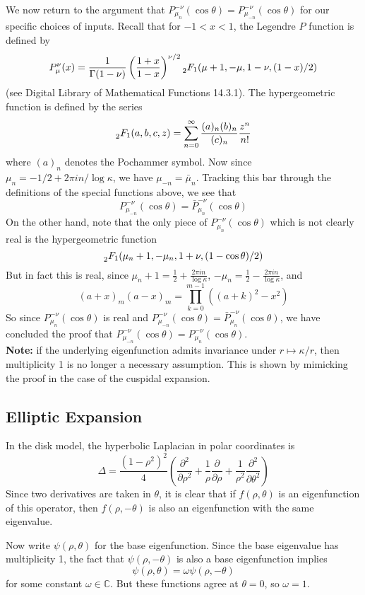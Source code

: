 \documentclass[]{article}
\begin{document}
We now return to the argument that $P_{\mu_{n}}^{-\nu}(\cos\theta) = P_{\mu_{-n}}^{-\nu}(\cos\theta)$ for our specific choices of inputs.
Recall that for $-1 < x < 1$, the Legendre $P$ function is defined by
$$
P_\mu^\nu(x) = 
\frac{1}{\Gamma(1 - \nu)}\left( \frac{1 + x}{1 - x} \right)^{\nu/2}\prescript{}{2}{F_1}(\mu + 1, -\mu, 1 - \nu, (1 - x)/2)
$$
(see Digital Library of Mathematical Functions 14.3.1).
The hypergeometric function is defined by the series
$$
\prescript{}{2}{F_1}(a, b, c, z) = \sum_{n=0}^{\infty}\frac{(a)_n(b)_n}{(c)_n}\frac{z^n}{n!}
$$
where $(a)_n$ denotes the Pochammer symbol.
Now since $\mu_n = -1/2 + 2\pi in/\log\kappa$, we have $\mu_{-n} = \bar{\mu}_n$.
Tracking this bar through the definitions of the special functions above, we see that
$$
P_{\mu_{-n}}^{-\nu}(\cos\theta) = \bar{P}_{\mu_{n}}^{-\nu}(\cos\theta)
$$
On the other hand, note that the only piece of $P_{\mu_{n}}^{-\nu}(\cos\theta)$ which is not clearly real is the hypergeometric function
$$
\prescript{}{2}{F_1}(\mu_n + 1, -\mu_n, 1 + \nu, (1 - \cos\theta)/2)
$$
But in fact this is real, since $\mu_n + 1 = \frac{1}{2} + \frac{2\pi in}{\log\kappa}$, $-\mu_n = \frac{1}{2} - \frac{2\pi in}{\log\kappa}$, and
$$
(a + x)_m(a - x)_m = \prod_{k=0}^{m-1}((a + k)^2 - x^2)
$$
So since $P_{\mu_{n}}^{-\nu}(\cos\theta)$ is real and $P_{\mu_{-n}}^{-\nu}(\cos\theta) = \bar{P}_{\mu_{n}}^{-\nu}(\cos\theta)$, we have concluded the proof that $P_{\mu_{-n}}^{-\nu}(\cos\theta) = P_{\mu_{n}}^{-\nu}(\cos\theta)$.
\\

\textbf{Note:} if the underlying eigenfunction admits invariance under $r \mapsto \kappa/r$, then multiplicity 1 is no longer a necessary assumption. This is shown by mimicking the proof in the case of the cuspidal expansion.

\subsection*{Elliptic Expansion}

In the disk model, the hyperbolic Laplacian in polar coordinates is
$$
\Delta = \frac{(1 - \rho^2)^2}{4}\left(\frac{\partial^2}{\partial\rho^2} +
\frac{1}{\rho}\frac{\partial}{\partial\rho} +
\frac{1}{\rho^2}\frac{\partial^2}{\partial\theta^2}\right)
$$
Since two derivatives are taken in $\theta$, it is clear that if $f(\rho, \theta)$ is an eigenfunction of this operator, then $f(\rho, -\theta)$ is also an eigenfunction with the same eigenvalue.

Now write $\psi(\rho, \theta)$ for the base eigenfunction.
Since the base eigenvalue has multiplicity 1, the fact that $\psi(\rho, -\theta)$ is also a base eigenfunction implies
$$
\psi(\rho, \theta) = \omega\psi(\rho, -\theta)
$$
for some constant $\omega \in \mathbb{C}$.
But these functions agree at $\theta = 0$, so $\omega = 1$.
\end{document}
